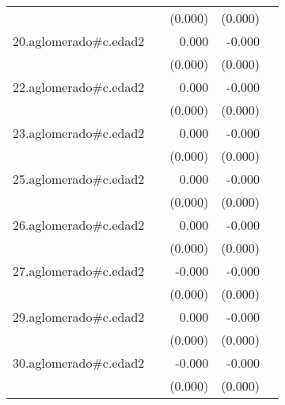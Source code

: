 {\begin{longtable}{l*{4}{D{.}{.}{-1}}}
            &                     &     (0.000)         &     (0.000)         &                     \\
\addlinespace
20.aglomerado#c.edad2&                     &       0.000         &      -0.000         &                     \\
            &                     &     (0.000)         &     (0.000)         &                     \\
\addlinespace
22.aglomerado#c.edad2&                     &       0.000         &      -0.000         &                     \\
            &                     &     (0.000)         &     (0.000)         &                     \\
\addlinespace
23.aglomerado#c.edad2&                     &       0.000         &      -0.000         &                     \\
            &                     &     (0.000)         &     (0.000)         &                     \\
\addlinespace
25.aglomerado#c.edad2&                     &       0.000         &      -0.000         &                     \\
            &                     &     (0.000)         &     (0.000)         &                     \\
\addlinespace
26.aglomerado#c.edad2&                     &       0.000         &      -0.000         &                     \\
            &                     &     (0.000)         &     (0.000)         &                     \\
\addlinespace
27.aglomerado#c.edad2&                     &      -0.000         &      -0.000\sym{**} &                     \\
            &                     &     (0.000)         &     (0.000)         &                     \\
\addlinespace
29.aglomerado#c.edad2&                     &       0.000         &      -0.000         &                     \\
            &                     &     (0.000)         &     (0.000)         &                     \\
\addlinespace
30.aglomerado#c.edad2&                     &      -0.000         &      -0.000\sym{**} &                     \\
            &                     &     (0.000)         &     (0.000)         &                     \\

\end{longtable}}
